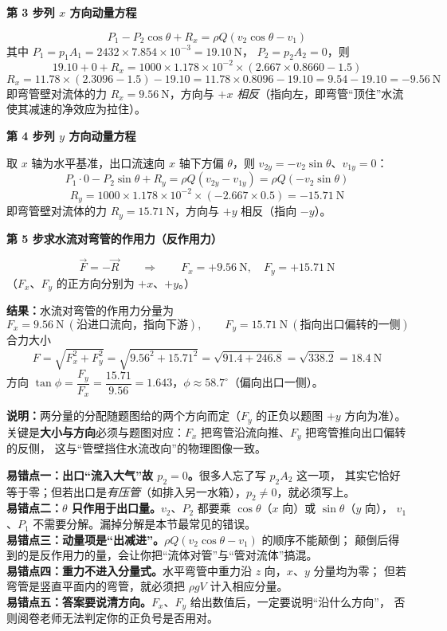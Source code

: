 \begin{jie}
\textbf{第 3 步\quad 列 $x$ 方向动量方程}

\[ P_1-P_2\cos\theta+R_x=\rho Q\left(v_2\cos\theta-v_1\right) \]
其中 $P_1=p_1A_1=2432\times7.854\times10^{-3}=19.10\ \mathrm{N}$，
$P_2=p_2A_2=0$，则
\[ 19.10+0+R_x=1000\times1.178\times10^{-2}\times(2.667\times0.8660-1.5) \]
\[ R_x=11.78\times(2.3096-1.5)-19.10=11.78\times0.8096-19.10=9.54-19.10=-9.56\ \mathrm{N} \]
即弯管壁对流体的力 $R_x=9.56\ \mathrm{N}$，方向与 $+x$ \emph{相反}（指向左，即弯管“顶住”水流使其减速的净效应为拉住）。

\textbf{第 4 步\quad 列 $y$ 方向动量方程}

取 $x$ 轴为水平基准，出口流速向 $x$ 轴下方偏 $\theta$，则 $v_{2y}=-v_2\sin\theta$、$v_{1y}=0$：
\[ P_1\cdot0-P_2\sin\theta+R_y=\rho Q\left(v_{2y}-v_{1y}\right)=\rho Q\left(-v_2\sin\theta\right) \]
\[ R_y=1000\times1.178\times10^{-2}\times(-2.667\times0.5)=-15.71\ \mathrm{N} \]
即弯管壁对流体的力 $R_y=15.71\ \mathrm{N}$，方向与 $+y$ 相反（指向 $-y$）。

\textbf{第 5 步\quad 求水流对弯管的作用力（反作用力）}

\[ \vec F=-\vec R\qquad\Longrightarrow\qquad F_x=+9.56\ \mathrm{N},\quad F_y=+15.71\ \mathrm{N} \]
（$F_x$、$F_y$ 的正方向分别为 $+x$、$+y$。）

\textbf{结果：}水流对弯管的作用力分量为
\[ F_x=9.56\ \mathrm{N}\ (\text{沿进口流向，指向下游}),\qquad
   F_y=15.71\ \mathrm{N}\ (\text{指向出口偏转的一侧}) \]
合力大小
\[ F=\sqrt{F_x^2+F_y^2}=\sqrt{9.56^2+15.71^2}=\sqrt{91.4+246.8}=\sqrt{338.2}=18.4\ \mathrm{N} \]
方向 $\tan\phi=\dfrac{F_y}{F_x}=\dfrac{15.71}{9.56}=1.643$，$\phi\approx58.7^\circ$（偏向出口一侧）。

\textbf{说明：}两分量的分配随题图给的两个方向而定（$F_y$ 的正负以题图 $+y$ 方向为准）。
关键是\textbf{大小与方向}必须与题图对应：$F_x$ 把弯管沿流向推、$F_y$ 把弯管推向出口偏转的反侧，
这与“管壁挡住水流改向”的物理图像一致。
\end{jie}

\begin{yicuo}
\textbf{易错点一：出口“流入大气”故 $p_2=0$。}很多人忘了写 $p_2A_2$ 这一项，
其实它恰好等于零；但若出口是\emph{有压管}（如排入另一水箱），$p_2\neq0$，就必须写上。\\
\textbf{易错点二：$\theta$ 只作用于出口量。}$v_2$、$P_2$ 都要乘 $\cos\theta$（$x$ 向）或 $\sin\theta$（$y$ 向），
$v_1$、$P_1$ 不需要分解。漏掉分解是本节最常见的错误。\\
\textbf{易错点三：动量项是“出减进”。}$\rho Q(v_2\cos\theta-v_1)$ 的顺序不能颠倒；
颠倒后得到的是反作用力的量，会让你把“流体对管”与“管对流体”搞混。\\
\textbf{易错点四：重力不进入分量式。}水平弯管中重力沿 $z$ 向，$x$、$y$ 分量均为零；
但若弯管是竖直平面内的弯管，就必须把 $\rho gV$ 计入相应分量。\\
\textbf{易错点五：答案要说清方向。}$F_x$、$F_y$ 给出数值后，一定要说明“沿什么方向”，
否则阅卷老师无法判定你的正负号是否用对。
\end{yicuo}

